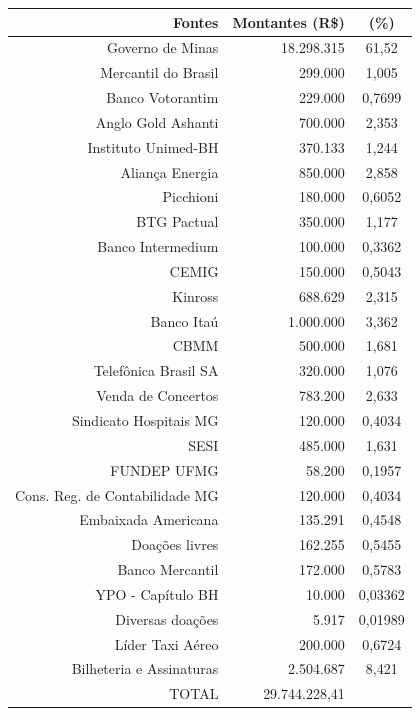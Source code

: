 \documentclass[a4paper, 12pt, openright, oneside, german, french, english, brazil]{abntex2}
\begin{document}
	\begin{table}[!h]
		{\begin{tabular}{rrc}
				\hline
				Fontes & Montantes (R\$) & (\%)  \\
				\hline
				Governo de Minas & 18.298.315 & 61,52 \\ 
				Mercantil do Brasil & 299.000 & 1,005 \\ 
				Banco Votorantim & 229.000 & 0,7699 \\ 
				Anglo Gold Ashanti & 700.000 & 2,353 \\ 
				Instituto Unimed-BH & 370.133 & 1,244 \\ 
				Aliança Energia & 850.000 & 2,858 \\ 
				Picchioni & 180.000 & 0,6052 \\ 
				BTG Pactual & 350.000 & 1,177 \\ 
				Banco Intermedium & 100.000 & 0,3362 \\ 
				CEMIG & 150.000 & 0,5043 \\ 
				Kinross & 688.629 & 2,315 \\ 
				Banco Itaú & 1.000.000 & 3,362 \\ 
				CBMM & 500.000 & 1,681 \\ 
				Telefônica Brasil SA & 320.000 & 1,076 \\ 
				Venda de Concertos & 783.200 & 2,633 \\ 
				Sindicato Hospitais MG & 120.000 & 0,4034 \\ 
				SESI & 485.000 & 1,631 \\ 
				FUNDEP UFMG & 58.200 & 0,1957 \\ 
				Cons. Reg. de Contabilidade MG & 120.000 & 0,4034 \\ 
				Embaixada Americana & 135.291 & 0,4548 \\ 
				Doações livres & 162.255 & 0,5455 \\ 
				Banco Mercantil & 172.000 & 0,5783 \\ 
				YPO - Capítulo BH & 10.000 & 0,03362 \\ 
				Diversas doações & 5.917 & 0,01989 \\ 
				Líder Taxi Aéreo & 200.000 & 0,6724 \\ 
				Bilheteria e Assinaturas & 2.504.687 & 8,421 \\ 
				\hline
				TOTAL & 29.744.228,41 &  \\
				\hline
			\end{tabular}
		}
		{
		}
	\end{table}
	
\end{document}
